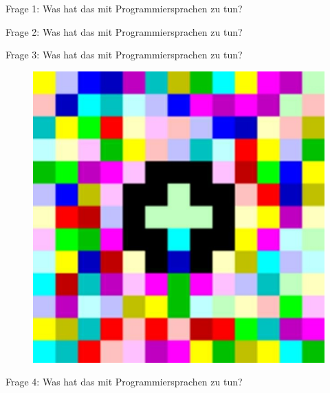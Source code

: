     \begin{frame}{Frage 1: Was hat das mit Programmiersprachen zu tun?}
         
    \end{frame}
    
    \begin{frame}{Frage 2: Was hat das mit Programmiersprachen zu tun?}
         
    \end{frame}
    
    \begin{frame}{Frage 3: Was hat das mit Programmiersprachen zu tun?}
         \begin{figure}
            \centering
            \includegraphics[width=\linewidth,height=0.5\textheight,keepaspectratio]{chapters/04_programming_languages/figures/hello_world_piet.jpg}
            \caption{\cite{fig:hello_world_piet}}
        \end{figure}
    \end{frame}
    
    \begin{frame}{Frage 4: Was hat das mit Programmiersprachen zu tun?}
         
    \end{frame}
    
